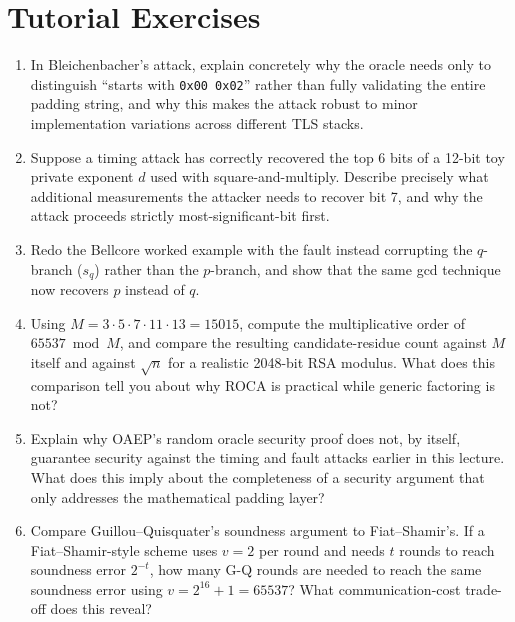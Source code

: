 \section*{Tutorial Exercises}
\begin{enumerate}
\item In Bleichenbacher's attack, explain concretely why the oracle needs only to distinguish ``starts with \texttt{0x00 0x02}'' rather than fully validating the entire padding string, and why this makes the attack robust to minor implementation variations across different TLS stacks.
\item Suppose a timing attack has correctly recovered the top 6 bits of a 12-bit toy private exponent $d$ used with square-and-multiply. Describe precisely what additional measurements the attacker needs to recover bit 7, and why the attack proceeds strictly most-significant-bit first.
\item Redo the Bellcore worked example with the fault instead corrupting the $q$-branch ($s_q$) rather than the $p$-branch, and show that the same gcd technique now recovers $p$ instead of $q$.
\item Using $M = 3 \cdot 5 \cdot 7 \cdot 11 \cdot 13 = 15015$, compute the multiplicative order of $65537 \bmod M$, and compare the resulting candidate-residue count against $M$ itself and against $\sqrt{n}$ for a realistic 2048-bit RSA modulus. What does this comparison tell you about why ROCA is practical while generic factoring is not?
\item Explain why OAEP's random oracle security proof does not, by itself, guarantee security against the timing and fault attacks earlier in this lecture. What does this imply about the completeness of a security argument that only addresses the mathematical padding layer?
\item Compare Guillou--Quisquater's soundness argument to Fiat--Shamir's. If a Fiat--Shamir-style scheme uses $v=2$ per round and needs $t$ rounds to reach soundness error $2^{-t}$, how many G-Q rounds are needed to reach the same soundness error using $v = 2^{16}+1 = 65537$? What communication-cost trade-off does this reveal?
\end{enumerate}
